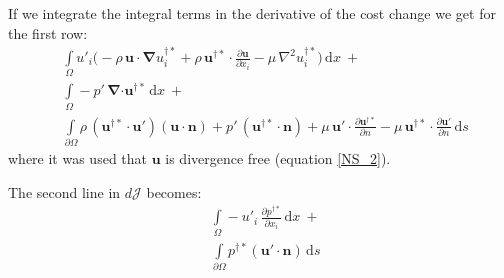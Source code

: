 \documentclass[12pt, a4paper]{article}
\begin{document}
If we integrate the integral terms in the derivative of the cost change we get for the first row:
\begin{equation}
\begin{split}
&\int\limits_{\Omega} u'_i \bigg( 
-\rho \, \mathbf{u \cdot} \boldsymbol{\nabla} u^{\dagger *}_i + 
\rho \, \mathbf{u^{\dagger *} \cdot} \frac{\partial \mathbf{u}}{\partial x_i} - 
\mu \, \nabla^2 u^{\dagger *}_i
\bigg) \, \mathrm{d} x \ + \\
&\int\limits_{\Omega} 
- p' \, \boldsymbol{\nabla} \mathbf{\cdot u^{\dagger *}}
\, \mathrm{d} x \ + \\
&\int\limits_{\partial \Omega}
\rho \, (\mathbf{u^{\dagger *} \cdot u'}) (\mathbf{u \cdot n}) + 
p' \, (\mathbf{u^{\dagger *} \cdot n}) + 
\mu \, \mathbf{u' \cdot} \frac{\partial \mathbf{u^{\dagger *}}}{\partial n} - 
\mu \, \mathbf{u^{\dagger *} \cdot} \frac{\partial \mathbf{u'}}{\partial n}
\, \mathrm{d} s
\end{split}
\end{equation}
where it was used that $\mathbf{u}$ is divergence free (equation \ref{NS_2}).

The second line in $d \mathcal{J}$ becomes:
\begin{equation}
\begin{split}
&\int\limits_{\Omega}
- u'_i \, \frac{\partial p^{\dagger *}}{\partial x_i}
\, \mathrm{d} x \ + \\
&\int\limits_{\partial \Omega}
p^{\dagger *} (\mathbf{u' \cdot n})
\, \mathrm{d} s
\end{split}
\end{equation}
\end{document}
